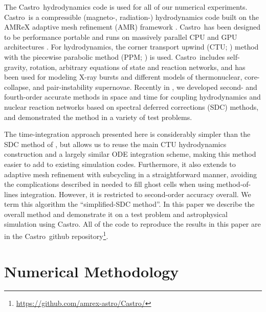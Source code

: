 \documentclass[times,preprint]{aastex63}
\newcommand{\castro}{{\sf Castro}}
\newcommand{\MarginPar}[1]{\marginpar{\vskip-\baselineskip\raggedright\tiny\sffamily\hrule\smallskip{\color{red}#1}\par\smallskip\hrule}}
\begin{document}
The \castro\ hydrodynamics code \citep{castro,castro_joss} is used for
all of our numerical experiments.  \castro\ is a compressible
(magneto-, radiation-) hydrodynamics code built on the AMReX adaptive
mesh refinement (AMR) framework \citep{amrex_joss}.  \castro\ has been
designed to be performance portable and runs on massively parallel CPU
and GPU architectures \citep{castro_gpu}.  For hydrodynamics, the
corner transport upwind (CTU; \citealt{ppmunsplit}) method with the
piecewise parabolic method (PPM; \citealt{ppm,millercolella:2002}) is
used.  \castro\ includes self-gravity, rotation, arbitrary equations
of state and reaction networks, and has been used for modeling X-ray
bursts and different models of thermonuclear, core-collapse, and
pair-instability supernovae.  Recently in \citet{castro_sdc}, we
developed second- and fourth-order accurate methods in space and time
for coupling hydrodynamics and nuclear reaction networks based on
spectral deferred corrections (SDC) methods, and demonstrated the
method in a variety of test problems.

The time-integration approach presented here is considerably simpler
than the SDC method of \citet{castro_sdc}, but allows us to reuse the
main CTU \MarginPar{any cites to CCSE papers?}  hydrodynamics
construction and a largely similar ODE integration scheme, making this
method easier to add to existing simulation codes.  Furthermore, it
also extends to adaptive mesh refinement with subcycling in a
straightforward manner, avoiding the complications described in
\citep{mccorquodalecolella} needed to fill ghost cells when using
method-of-lines integration.  However, it is restricted to
second-order accuracy overall.  We term this algorithm the
``simplified-SDC method''.  In this paper we describe the overall
method and demonstrate it on a test problem and astrophysical
simulation using \castro.  All of the code to reproduce the results in
this paper are in the \castro\ github
repository\footnote{\url{https://github.com/amrex-astro/Castro/}}.

\section{Numerical Methodology}
\end{document}
